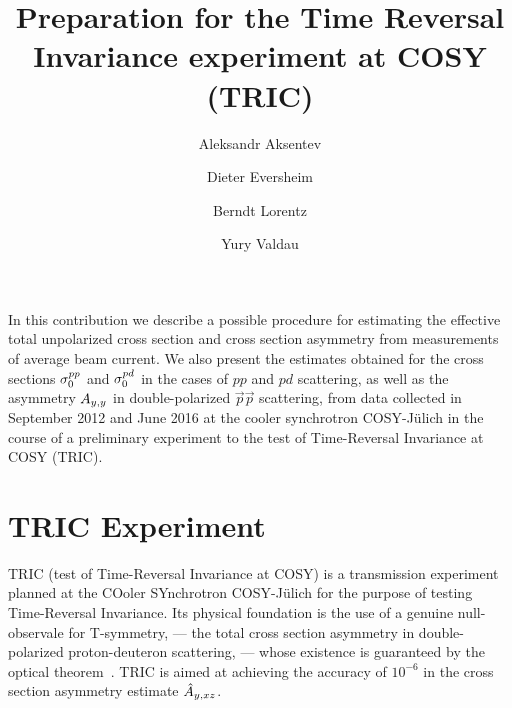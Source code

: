 \documentclass[reprint, superscriptaddress]{revtex4-1}
\begin{document}
\title{Preparation for the Time Reversal Invariance experiment at COSY (TRIC)}
\author{Aleksandr Aksentev}
\author{Dieter Eversheim}
\author{Berndt Lorentz}
\author{Yury Valdau}

\maketitle

\captionsetup[figure]{labelfont=bf,textfont=normalfont,singlelinecheck=off,justification=raggedright}

	
	
\begin{abstractname}
 In this contribution we describe a possible procedure for estimating the effective total unpolarized cross section and cross section asymmetry from measurements of average beam current. We also present the estimates obtained for the cross sections $\CS[0]^{pp}$ and $\CS[0]^{pd}$ in the cases of $pp$ and $pd$ scattering, as well as the asymmetry $\Ayy$ in double-polarized $\vec{p}\vec{p}$ scattering, from data collected in September 2012 and June 2016 at the cooler synchrotron COSY-J\"ulich in the course of a preliminary experiment to the test of Time-Reversal Invariance at COSY (TRIC). 
\end{abstractname}

\section{TRIC Experiment}

TRIC (test of Time-Reversal Invariance at COSY) is a transmission experiment planned at the COoler SYnchrotron COSY-J\"ulich for the purpose of testing Time-Reversal Invariance. Its physical foundation is the use of a genuine null-observale for T-symmetry, --- the total cross section asymmetry in double-polarized proton-deuteron scattering, --- whose existence is guaranteed by the optical theorem~\cite{Conzett}. TRIC is aimed at achieving the accuracy of $10^{-6}$ in the cross section asymmetry estimate $\Ayxz*$.
\end{document}
